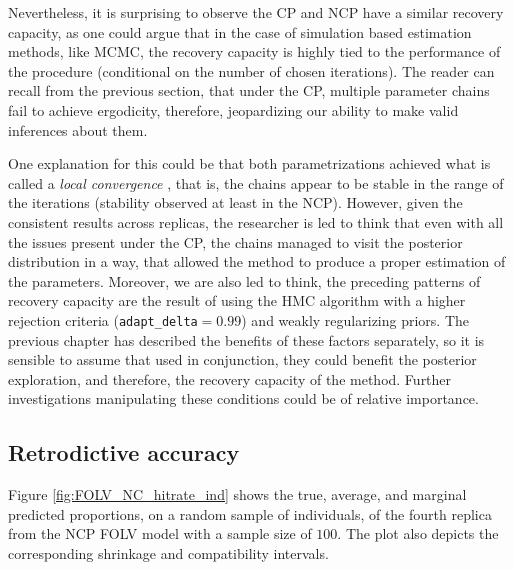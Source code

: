 Nevertheless, it is surprising to observe the CP and NCP have a similar recovery capacity, as one could argue that in the case of simulation based estimation methods, like MCMC, the recovery capacity is highly tied to the performance of the procedure (conditional on the number of chosen iterations). The reader can recall from the previous section, that under the CP, multiple parameter chains fail to achieve ergodicity, therefore, jeopardizing our ability to make valid inferences about them. 

One explanation for this could be that both parametrizations achieved what is called a \textit{local convergence} \cite{Depaoli_2021}, that is, the chains appear to be stable in the range of the iterations (stability observed at least in the NCP). However, given the consistent results across replicas, the researcher is led to think that even with all the issues present under the CP, the chains managed to visit the posterior distribution in a way, that allowed the method to produce a proper estimation of the parameters. Moreover, we are also led to think, the preceding patterns of recovery capacity are the result of using the HMC algorithm with a higher rejection criteria (\texttt{adapt\_delta}$=0.99$) and weakly regularizing priors. The previous chapter has described the benefits of these factors separately, so it is sensible to assume that used in conjunction, they could benefit the posterior exploration, and therefore, the recovery capacity of the method. Further investigations manipulating these conditions could be of relative importance.



\subsection{Retrodictive accuracy}

Figure \ref{fig:FOLV_NC_hitrate_ind} shows the true, average, and marginal predicted proportions, on a random sample of individuals, of the fourth replica from the NCP FOLV model with a sample size of $100$. The plot also depicts the corresponding shrinkage and compatibility intervals. 

